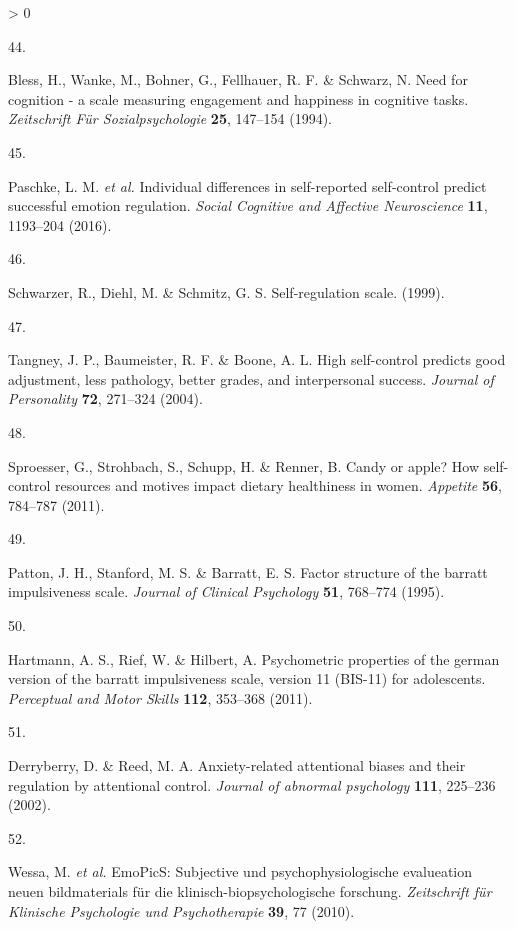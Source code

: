 \documentclass[
  english,
  man,floatsintext]{apa6}
\newlength{\cslhangindent}
\newlength{\csllabelwidth}
\newenvironment{CSLReferences}[2] %
 {%
  \setlength{\parindent}{0pt}
  \ifodd #1 \everypar{\setlength{\hangindent}{\cslhangindent}}\ignorespaces\fi
  \ifnum #2 > 0
  \setlength{\parskip}{#2\baselineskip}
  \fi
 }%
 {}
\newcommand{\CSLLeftMargin}[1]{\parbox[t]{\csllabelwidth}{#1}}
\newcommand{\CSLRightInline}[1]{\parbox[t]{\linewidth - \csllabelwidth}{#1}\break}
\begin{document}
\begin{CSLReferences}{0}{0}
\leavevmode\hypertarget{ref-Bless1994}{}%
\CSLLeftMargin{44. }
\CSLRightInline{Bless, H., Wanke, M., Bohner, G., Fellhauer, R. F. \& Schwarz, N. Need for cognition - a scale measuring engagement and happiness in cognitive tasks. \emph{Zeitschrift Für Sozialpsychologie} \textbf{25}, 147--154 (1994).}

\leavevmode\hypertarget{ref-Paschke2016}{}%
\CSLLeftMargin{45. }
\CSLRightInline{Paschke, L. M. \emph{et al.} Individual differences in self-reported self-control predict successful emotion regulation. \emph{Social Cognitive and Affective Neuroscience} \textbf{11}, 1193--204 (2016).}

\leavevmode\hypertarget{ref-Schwarzer1999}{}%
\CSLLeftMargin{46. }
\CSLRightInline{Schwarzer, R., Diehl, M. \& Schmitz, G. S. Self-regulation scale. (1999).}

\leavevmode\hypertarget{ref-Tangney2004}{}%
\CSLLeftMargin{47. }
\CSLRightInline{Tangney, J. P., Baumeister, R. F. \& Boone, A. L. High self-control predicts good adjustment, less pathology, better grades, and interpersonal success. \emph{Journal of Personality} \textbf{72}, 271--324 (2004).}

\leavevmode\hypertarget{ref-Sproesser2011}{}%
\CSLLeftMargin{48. }
\CSLRightInline{Sproesser, G., Strohbach, S., Schupp, H. \& Renner, B. Candy or apple? How self-control resources and motives impact dietary healthiness in women. \emph{Appetite} \textbf{56}, 784--787 (2011).}

\leavevmode\hypertarget{ref-Patton1995}{}%
\CSLLeftMargin{49. }
\CSLRightInline{Patton, J. H., Stanford, M. S. \& Barratt, E. S. Factor structure of the barratt impulsiveness scale. \emph{Journal of Clinical Psychology} \textbf{51}, 768--774 (1995).}

\leavevmode\hypertarget{ref-Hartmann2011}{}%
\CSLLeftMargin{50. }
\CSLRightInline{Hartmann, A. S., Rief, W. \& Hilbert, A. Psychometric properties of the german version of the barratt impulsiveness scale, version 11 (BIS-11) for adolescents. \emph{Perceptual and Motor Skills} \textbf{112}, 353--368 (2011).}

\leavevmode\hypertarget{ref-Derryberry2002}{}%
\CSLLeftMargin{51. }
\CSLRightInline{Derryberry, D. \& Reed, M. A. Anxiety-related attentional biases and their regulation by attentional control. \emph{Journal of abnormal psychology} \textbf{111}, 225--236 (2002).}

\leavevmode\hypertarget{ref-Wessa2010}{}%
\CSLLeftMargin{52. }
\CSLRightInline{Wessa, M. \emph{et al.} EmoPicS: Subjective und psychophysiologische evalueation neuen bildmaterials für die klinisch-biopsychologische forschung. \emph{Zeitschrift für Klinische Psychologie und Psychotherapie} \textbf{39}, 77 (2010).}


\end{CSLReferences}
\end{document}
